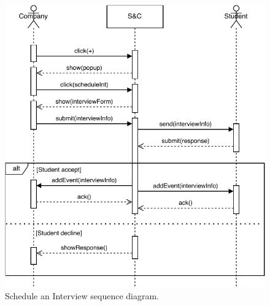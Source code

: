 \begin{figure}[H]
    \begin{center}
        \includegraphics[width=\linewidth]{Images/SequenceDiagram/ScheduleInterviewSD.pdf}
        \caption{Schedule an Interview sequence diagram.}
        \label{fig:schedule_interview_seqdiag}%
    \end{center}
\end{figure}

\newpage

